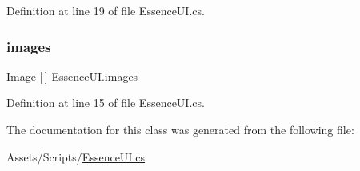 Definition at line 19 of file Essence\+U\+I.\+cs.

\mbox{\label{class_essence_u_i_a08b6afcc69283f73676b25f7d3faea16}} 
\subsubsection{\texorpdfstring{images}{images}}
{\footnotesize\ttfamily Image \mbox{[}$\,$\mbox{]} Essence\+U\+I.\+images\hspace{0.3cm}{\ttfamily [get]}}



Definition at line 15 of file Essence\+U\+I.\+cs.



The documentation for this class was generated from the following file\+:\begin{DoxyCompactItemize}
\item 
Assets/\+Scripts/\mbox{\hyperlink{_essence_u_i_8cs}{Essence\+U\+I.\+cs}}\end{DoxyCompactItemize}

